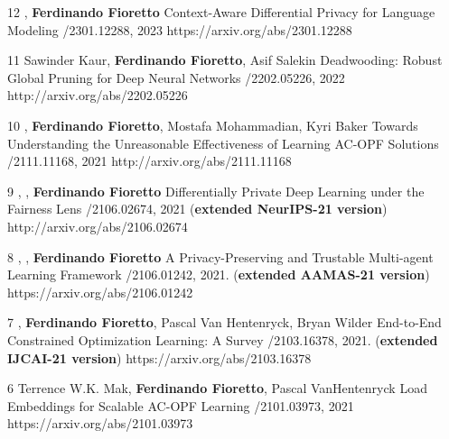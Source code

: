 \begin{pubs}

\wsentry 
	{12}%
	{, {\bf Ferdinando Fioretto}}
	{Context-Aware Differential Privacy for Language Modeling}
	{/2301.12288, 2023}
	{https://arxiv.org/abs/2301.12288}

\wsentry 
	{11}%
	{Sawinder Kaur, {\bf Ferdinando Fioretto}, Asif Salekin}
	{Deadwooding: Robust Global Pruning for Deep Neural Networks} 
	{/2202.05226, 2022}
	{http://arxiv.org/abs/2202.05226}

\wsentry 
	{10}%
	{, {\bf Ferdinando Fioretto}, Mostafa Mohammadian, Kyri Baker}
	{Towards Understanding the Unreasonable Effectiveness of Learning AC-OPF Solutions}
	{/2111.11168, 2021}
	{http://arxiv.org/abs/2111.11168}


\wsentry %
	{9}%
	{, , {\bf Ferdinando Fioretto}}
	{Differentially Private Deep Learning under the Fairness Lens}
	{/2106.02674, 2021 ({\bf extended NeurIPS-21 version})}
	{http://arxiv.org/abs/2106.02674}

\wsentry 
	{8}%
	{, , {\bf Ferdinando Fioretto}}
	{A Privacy-Preserving and Trustable Multi-agent Learning Framework}
	{/2106.01242, 2021. ({\bf extended AAMAS-21 version})}
	{https://arxiv.org/abs/2106.01242}

\wsentry %
	{7}%
	{, {\bf Ferdinando Fioretto}, Pascal Van Hentenryck, Bryan Wilder}
	{End-to-End Constrained Optimization Learning: A Survey}
	{/2103.16378, 2021. ({\bf extended IJCAI-21 version})}
	{https://arxiv.org/abs/2103.16378}

\wsentry 
	{6}%
	{Terrence W.K. Mak, {\bf Ferdinando Fioretto}, Pascal VanHentenryck}
	{Load Embeddings for Scalable AC-OPF Learning}
	{/2101.03973, 2021}
	{https://arxiv.org/abs/2101.03973}


\end{pubs}
